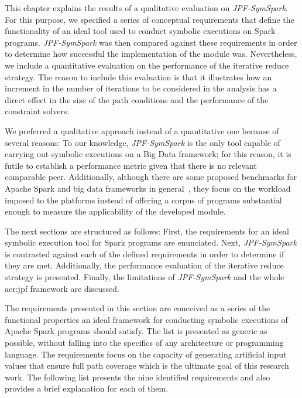 
This chapter explains the results of a qualitative evaluation on \textit{JPF-SymSpark}. For this purpose, we specified a series of conceptual requirements that define the functionality of an ideal tool used to conduct symbolic executions on Spark programs. \textit{JPF-SymSpark} was then compared against these requirements in order to determine how successful the implementation of the module was. Nevertheless, we include a quantitative evaluation on the performance of the iterative reduce strategy. The reason to include this evaluation is that it illustrates how an increment in the number of iterations to be considered in the analysis has a direct effect in the size of the path conditions and the performance of the constraint solvers.

We preferred a qualitative approach instead of a quantitative one because of several reasons: To our knowledge, \textit{JPF-SymSpark} is the only tool capable of carrying out symbolic executions on a Big Data framework; for this reason, it is futile to establish a performance metric given that there is no relevant comparable peer. Additionally, although there are some proposed benchmarks for Apache Spark and big data frameworks in general~\cite{Li2015,Pavlo2009,Wang2014}, they focus on the workload imposed to the platforms instead of offering a corpus of programs substantial enough to measure the applicability of the developed module.

The next sections are structured as follows: First, the requirements for an ideal symbolic execution tool for Spark programs are enunciated. Next, \textit{JPF-SymSpark} is contrasted against each of the defined requirements in order to determine if they are met. Additionally, the performance evaluation of the iterative reduce strategy is presented. Finally, the limitations of \textit{JPF-SymSpark} and the whole \acrshort{acr:jpf} framework are discussed.

\label{sec:requirements}

The requirements presented in this section are conceived as a series of the functional properties an ideal framework for conducting symbolic executions of Apache Spark programs should satisfy. The list is presented as generic as possible, without falling into the specifics of any architecture or programming language. The requirements focus on the capacity of generating artificial input values that ensure full path coverage which is the ultimate goal of this research work. The following list presents the nine identified requirements and also provides a brief explanation for each of them. 

